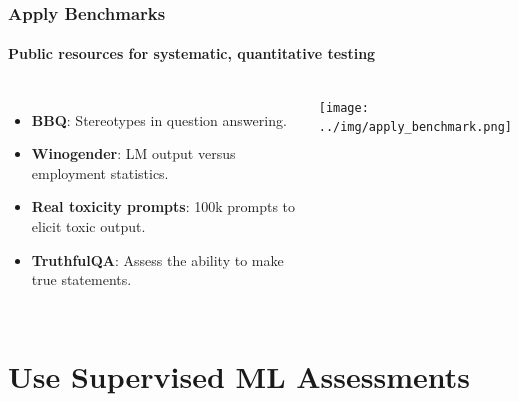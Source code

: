 \documentclass[11pt,
               aspectratio=169,
               hyperref={colorlinks}
               ]{beamer}
\begin{document}
		\begin{frame}
			
			\frametitle{Apply Benchmarks}
			\framesubtitle{Public resources for systematic, quantitative testing}
			
			\begin{columns}
				\vspace{-5pt}
				\begin{itemize}
					\item \textbf{BBQ}: Stereotypes in question answering.
					\item \textbf{Winogender}: LM output versus employment statistics.
					\item \textbf{Real toxicity prompts}: 100k prompts to elicit toxic output.
					\item \textbf{TruthfulQA}: Assess the ability to make true statements.
				\end{itemize}
				\centering
				\newline  \newline  \newline
				\texttt{[image: ../img/apply\_benchmark.png]} 
				\newline
			\end{columns}
					
		\end{frame}


	\section{Use Supervised ML Assessments}
\end{document}
